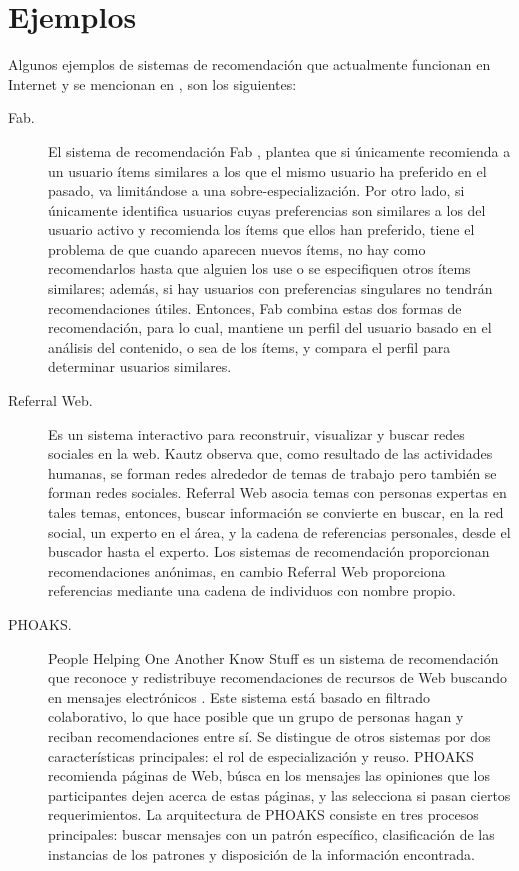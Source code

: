 \documentclass[12pt,letterpaper,oneside] {memoir}
\begin{document}
\section{Ejemplos}
Algunos ejemplos de sistemas de recomendación que actualmente funcionan en Internet y se mencionan en \citep{PerezCordon2008}, son los siguientes:
\begin{description}

\item[Fab.] El sistema de recomendación  Fab \citep{Balabanovic1997}, plantea que si únicamente recomienda a un usuario ítems similares a los que el mismo usuario ha preferido en el pasado, va limitándose a una sobre-especialización. Por otro lado,  si únicamente identifica usuarios cuyas preferencias son similares a los del usuario activo y recomienda los ítems que ellos han preferido, tiene el problema de que cuando aparecen nuevos ítems, no hay como recomendarlos hasta que alguien los use o se especifiquen  otros ítems similares; además, si hay usuarios con preferencias singulares no tendrán recomendaciones útiles. Entonces, Fab combina estas dos formas de recomendación, para lo cual, mantiene un perfil del usuario basado en el análisis del contenido, o sea de los ítems, y compara el perfil para determinar usuarios similares.

\item[Referral Web.] Es un sistema interactivo para reconstruir, visualizar y buscar redes sociales en la web. Kautz observa que, como resultado de las actividades humanas, se forman redes alrededor de temas de trabajo pero también se forman redes sociales. Referral Web asocia temas con personas expertas en tales temas, entonces, buscar información se convierte en buscar, en la red social, un experto en el área, y la cadena de referencias personales, desde el buscador hasta el experto. Los sistemas de recomendación  proporcionan recomendaciones anónimas, en cambio Referral Web proporciona referencias mediante una cadena de individuos con nombre propio.

\item [PHOAKS.]  People Helping One Another Know Stuff es un sistema de recomendación que reconoce y redistribuye recomendaciones de recursos de Web buscando en mensajes electrónicos \citep{Terveen1997}. Este sistema está basado en filtrado colaborativo, lo que hace posible que un grupo de personas hagan y reciban recomendaciones entre sí. Se distingue de otros sistemas por dos características principales: el rol de especialización y reuso. PHOAKS recomienda páginas de Web, búsca en los mensajes las opiniones que los participantes dejen acerca de estas páginas, y las selecciona si pasan ciertos requerimientos. La arquitectura de PHOAKS consiste en tres procesos principales: buscar mensajes con un patrón específico, clasificación de las instancias de los patrones y disposición de la información encontrada.


\end{description}
\end{document}
